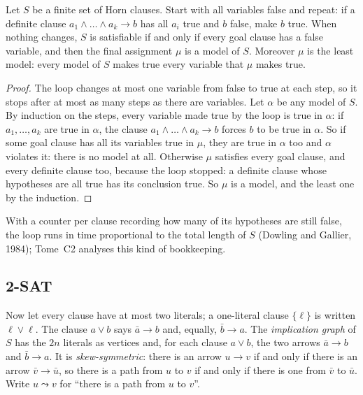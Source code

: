 \begin{theorem}\label{thm:horn}
Let $S$ be a finite set of Horn clauses. Start with all variables false and repeat: if a definite clause $a_1\land\dots\land a_k\to b$ has all
$a_i$ true and $b$ false, make $b$ true. When nothing changes, $S$ is satisfiable if and only if every goal clause has a false
variable, and then the final assignment $\mu$ is a model of $S$. Moreover $\mu$ is the least model: every model of $S$ makes true
every variable that $\mu$ makes true.
\end{theorem}
\begin{proof}
The loop changes at most one variable from false to true at each step, so it stops after at most as many steps as there
are variables. Let $\alpha$ be any model of $S$. By induction on the steps, every variable made true by the loop is true in $\alpha$: if
$a_1,\dots,a_k$ are true in $\alpha$, the clause $a_1\land\dots\land a_k\to b$ forces $b$ to be true in $\alpha$. So if some goal clause has all its variables
true in $\mu$, they are true in $\alpha$ too and $\alpha$ violates it: there is no model at all. Otherwise $\mu$ satisfies every goal
clause, and every definite clause too, because the loop stopped: a definite clause whose hypotheses are all true has
its conclusion true. So $\mu$ is a model, and the least one by the induction.
\end{proof}

With a counter per clause recording how many of its hypotheses are still false, the loop runs in time proportional
to the total length of $S$ (Dowling and Gallier, 1984); Tome~C2 analyses this kind of bookkeeping.

\subsection*{2-SAT}

Now let every clause have at most two literals; a one-literal clause $\{\ell\}$ is written $\ell\lor\ell$. The clause $a\lor b$ says $\bar a\to b$
and, equally, $\bar b\to a$. The \emph{implication graph} of $S$ has the $2n$ literals as vertices and, for each clause $a\lor b$, the two arrows
$\bar a\to b$ and $\bar b\to a$. It is \emph{skew-symmetric}: there is an arrow $u\to v$ if and only if there is an arrow $\bar v\to\bar u$, so there is a path
from $u$ to $v$ if and only if there is one from $\bar v$ to $\bar u$. Write $u\leadsto v$ for ``there is a path from $u$ to $v$''.

